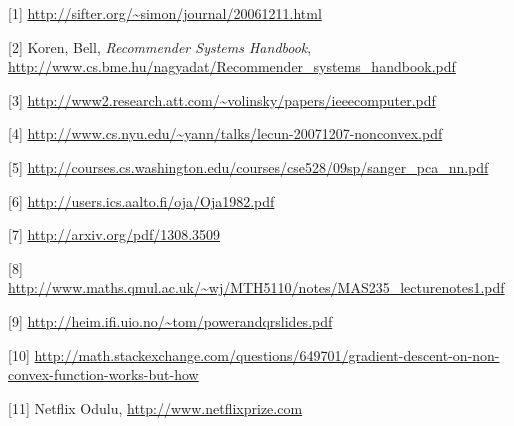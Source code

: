 \documentclass[12pt,fleqn]{article}\usepackage{../common}
\begin{document}
[1] \url{http://sifter.org/~simon/journal/20061211.html}

[2] Koren, Bell, {\em Recommender Systems Handbook},
\url{http://www.cs.bme.hu/nagyadat/Recommender_systems_handbook.pdf}

[3] \url{http://www2.research.att.com/~volinsky/papers/ieeecomputer.pdf}

[4] \url{http://www.cs.nyu.edu/~yann/talks/lecun-20071207-nonconvex.pdf}

[5] \url{http://courses.cs.washington.edu/courses/cse528/09sp/sanger_pca_nn.pdf}

[6] \url{http://users.ics.aalto.fi/oja/Oja1982.pdf}

[7] \url{http://arxiv.org/pdf/1308.3509}

[8] \url{http://www.maths.qmul.ac.uk/~wj/MTH5110/notes/MAS235_lecturenotes1.pdf}

[9] \url{http://heim.ifi.uio.no/~tom/powerandqrslides.pdf}

[10] \url{http://math.stackexchange.com/questions/649701/gradient-descent-on-non-convex-function-works-but-how}

[11] Netflix Odulu, \url{http://www.netflixprize.com}
\end{document}

